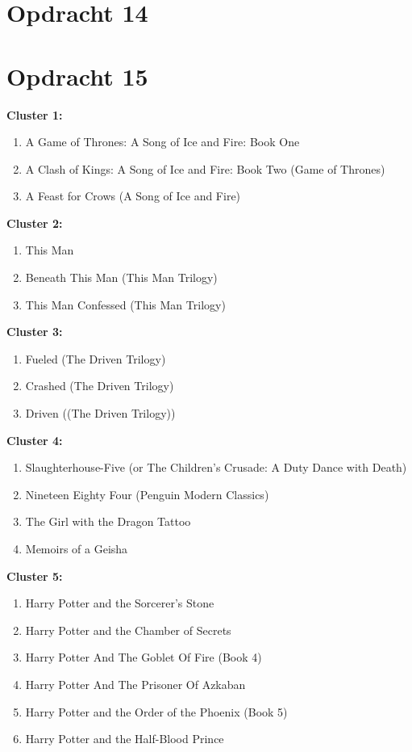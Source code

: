 \documentclass[11pt,a4paper]{article}
\begin{document}


\section*{Opdracht 14}




\section*{Opdracht 15}

\textbf{Cluster 1:}
\begin{enumerate}
\item A Game of Thrones: A Song of Ice and Fire: Book One
\item A Clash of Kings: A Song of Ice and Fire: Book Two (Game of Thrones)
\item A Feast for Crows (A Song of Ice and Fire)
\end{enumerate}
\textbf{Cluster 2:}
\begin{enumerate}
\item This Man
\item Beneath This Man (This Man Trilogy)
\item This Man Confessed (This Man Trilogy)
\end{enumerate}
\textbf{Cluster 3:}
\begin{enumerate}
\item Fueled (The Driven Trilogy)
\item Crashed (The Driven Trilogy)
\item Driven ((The Driven Trilogy))
\end{enumerate}
\textbf{Cluster 4:}
\begin{enumerate}
\item Slaughterhouse-Five (or The Children's Crusade: A Duty Dance with Death)
\item Nineteen Eighty Four (Penguin Modern Classics)
\item The Girl with the Dragon Tattoo
\item Memoirs of a Geisha
\end{enumerate}
\textbf{Cluster 5:}
\begin{enumerate}
\item Harry Potter and the Sorcerer's Stone
\item Harry Potter and the Chamber of Secrets
\item Harry Potter And The Goblet Of Fire (Book 4)
\item Harry Potter And The Prisoner Of Azkaban
\item Harry Potter and the Order of the Phoenix (Book 5)
\item Harry Potter and the Half-Blood Prince
\end{enumerate}
\end{document}
